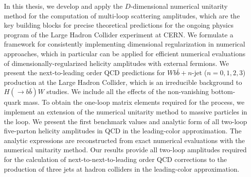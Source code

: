 In this thesis, we develop and apply the $D$-dimensional numerical unitarity method for
the computation of multi-loop scattering amplitudes, which
are the key building blocks for precise theoretical predictions for the ongoing physics program of the Large Hadron Collider experiment at CERN.
We formulate a framework for consistently implementing dimensional regularization in numerical approaches, which in particular
can be applied for efficient numerical evaluations of dimensionally-regularized helicity amplitudes with external fermions.
We present the next-to-leading order QCD predictions for $Wb\bar{b}+n$-jet ($n=0,1,2,3$) production at the Large Hadron Collider,
which is an irreducible background to $H(\rightarrow b{\bar b})W$ studies.
We include all the effects of the non-vanishing bottom-quark mass. 
To obtain the one-loop matrix elements required for the process,
we implement an extension of the numerical unitarity method to massive particles in the loop.
We present the first benchmark values and analytic form of all two-loop five-parton helicity amplitudes in QCD in the leading-color approximation.
The analytic expressions are reconstructed from exact numerical evaluations with the numerical unitarity method.
Our results provide all two-loop
amplitudes required for the calculation of next-to-next-to-leading order
QCD corrections to the production of three jets at hadron colliders in
the leading-color approximation.


